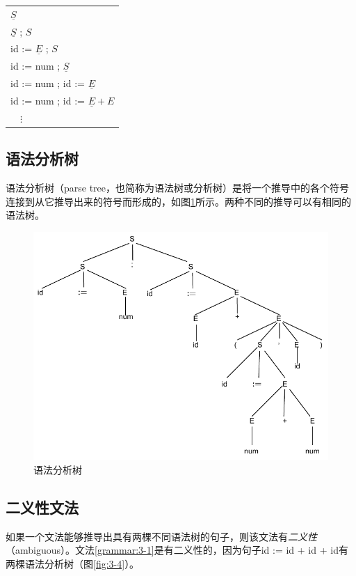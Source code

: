 \documentclass[cn,11pt,chinese]{elegantbook}
\begin{document}
\begin{table}[htbp]
\centering
\begin{tabular}{l}
  $\underline{S}$ \\
  $\underline{S}$ ; $S$ \\
  id := $\underline{E}$ ; $S$ \\
  id := num ; $\underline{S}$ \\
  id := num ; id := $\underline{E}$ \\
  id := num ; id := $\underline{E} + E$ \\
  $\quad\vdots$ \\
\end{tabular}
\end{table}

\subsection{语法分析树}

语法分析树（parse tree，也简称为语法树或分析树）是将一个推导中的各个符号连接到从它推导出来的符号而形成的，如图\ref{fig:3-3}所示。两种不同的推导可以有相同的语法树。

\begin{figure}[htbp]
  \centering
  \includegraphics[width=.8\textwidth]{3-3.pdf}
  \caption{语法分析树}
  \label{fig:3-3}
\end{figure}

\subsection{二义性文法}

如果一个文法能够推导出具有两棵不同语法树的句子，则该文法有\textit{二义性}（ambiguous）。文法\ref{grammar:3-1}是有二义性的，因为句子id := id + id + id有两棵语法分析树（图\ref{fig:3-4}）。
\end{document}
